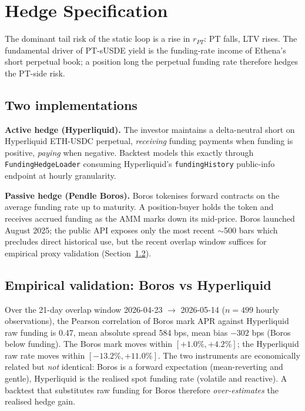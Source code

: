 \documentclass[11pt,a4paper]{article}
\begin{document}
\section{Hedge Specification}
\label{sec:hedge}

The dominant tail risk of the static loop is a rise in \(r_{PT}\):
PT falls, LTV rises. The fundamental driver of PT-sUSDE yield is
the funding-rate income of Ethena's short perpetual book; a
position long the perpetual funding rate therefore hedges the
PT-side risk.

\subsection{Two implementations}

\textbf{Active hedge (Hyperliquid).} The investor maintains a
delta-neutral short on Hyperliquid ETH-USDC perpetual,
\emph{receiving} funding payments when funding is positive,
\emph{paying} when negative. Backtest models this exactly through
\texttt{FundingHedgeLoader} consuming Hyperliquid's
\texttt{fundingHistory} public-info endpoint at hourly granularity.

\textbf{Passive hedge (Pendle Boros).} Boros tokenises forward
contracts on the average funding rate up to maturity. A
position-buyer holds the token and receives accrued funding as
the AMM marks down its mid-price. Boros launched August 2025;
the public API exposes only the most recent \(\sim\)500 bars
which precludes direct historical use, but the recent overlap
window suffices for empirical proxy validation
(Section~\ref{sec:boros-validation}).

\subsection{Empirical validation: Boros vs Hyperliquid}
\label{sec:boros-validation}

Over the 21-day overlap window
2026-04-23 \(\rightarrow\) 2026-05-14 (\(n=499\) hourly observations),
the Pearson correlation of Boros mark APR against Hyperliquid raw
funding is 0.47, mean absolute spread 584 bps, mean bias
\(-302\) bps (Boros below funding). The Boros mark moves within
\([+1.0\%, +4.2\%]\); the Hyperliquid raw rate moves within
\([-13.2\%, +11.0\%]\). The two instruments are economically
related but \emph{not} identical: Boros is a forward expectation
(mean-reverting and gentle), Hyperliquid is the realised spot
funding rate (volatile and reactive). A backtest that substitutes
raw funding for Boros therefore \emph{over-estimates} the realised
hedge gain.
\end{document}
